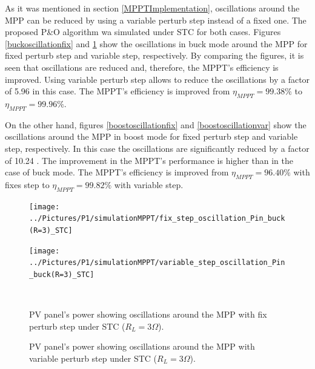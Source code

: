 As it was mentioned in section \ref{MPPTImplementation}, oscillations around the MPP can be reduced by using a variable perturb step instead of a fixed one. The proposed P\&O algorithm wa simulated under STC for both cases. Figures \ref{buckoscillationfix} and \ref{buckoscillationvar} show the oscillations in buck mode around the MPP for fixed perturb step and variable step, respectively. By comparing the figures, it is seen that oscillations are reduced and, therefore, the MPPT's efficiency is improved. Using variable perturb step allows to reduce the oscillations by a factor of 5.96 in this case. The MPPT's efficiency is improved from $\eta_{MPPT} = 99.38\% $ to $\eta_{MPPT} = 99.96\% $. 

On the other hand, figures \ref{boostoscillationfix} and \ref{boostoscillationvar} show the oscillations around the MPP in boost mode for fixed perturb step and variable step, respectively. In this case the oscillations are significantly reduced by a factor of 10.24 . The improvement in the MPPT's performance is higher than in the case of buck mode. The MPPT's efficiency is improved from $\eta_{MPPT} = 96.40\% $ with fixes step to $\eta_{MPPT} = 99.82\% $ with variable step. 

\begin{figure}[H]
	\begin{minipage}[c]{0.6\textwidth}
		\centering
		\texttt{[image: ../Pictures/P1/simulationMPPT/fix\_step\_oscillation\_Pin\_buck(R=3)\_STC]} %
	\end{minipage}%
	\hfill
	\begin{minipage}[c]{0.6\textwidth}
		\centering
		\texttt{[image: ../Pictures/P1/simulationMPPT/variable\_step\_oscillation\_Pin\_buck(R=3)\_STC]} %
	\end{minipage} \\ %
	\begin{minipage}[t]{0.6\textwidth}
		\caption{PV panel's power showing oscillations around the MPP with fix perturb step under STC ($R_{L}=3\Omega$).} %
		\label{buckoscillationfix}
	\end{minipage}%
	\hfill
	\begin{minipage}[t]{0.6\textwidth}
		\caption{PV panel's power showing oscillations around the MPP with variable perturb step under STC ($R_{L}=3\Omega$).} %
		\label{buckoscillationvar}
	\end{minipage}
\end{figure}


